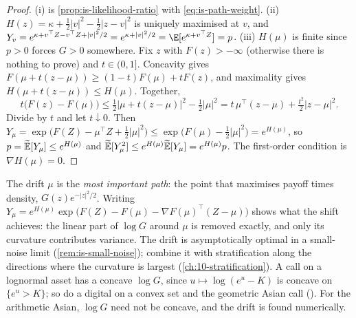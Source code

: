 \begin{proof}
(i) is \cref{prop:is-likelihood-ratio} with \eqref{eq:is-path-weight}.
(ii) $H(z)=\kappa+\frac12|v|^2-\frac12|z-v|^2$ is uniquely maximised at $v$, and
$Y_v=e^{\kappa+v^\top Z-v^\top Z+|v|^2/2}=e^{\kappa+|v|^2/2}=\E[e^{\kappa+v^\top Z}]=p$.
(iii) $H(\mu)$ is finite since $p>0$ forces $G>0$ somewhere. Fix $z$ with $F(z)>-\infty$
(otherwise there is nothing to prove) and $t\in(0,1]$. Concavity gives
$F(\mu+t(z-\mu))\ge(1-t)F(\mu)+tF(z)$, and maximality gives
$H(\mu+t(z-\mu))\le H(\mu)$. Together,
\[
  t\big(F(z)-F(\mu)\big)\le\tfrac12|\mu+t(z-\mu)|^2-\tfrac12|\mu|^2=t\,\mu^\top(z-\mu)+\tfrac{t^2}2|z-\mu|^2 .
\]
Divide by $t$ and let $t\downarrow0$. Then
$Y_\mu=\exp\big(F(Z)-\mu^\top Z+\frac12|\mu|^2\big)\le\exp\big(F(\mu)-\frac12|\mu|^2\big)=e^{H(\mu)}$,
so $p=\widetilde{\mathbb E}[Y_\mu]\le e^{H(\mu)}$ and $\widetilde{\mathbb E}[Y_\mu^2]\le e^{H(\mu)}\widetilde{\mathbb E}[Y_\mu]=e^{H(\mu)}p$.
The first-order condition is $\nabla H(\mu)=0$.
\end{proof}

The drift $\mu$ is the \emph{most important path}: the point that maximises payoff times
density, $G(z)e^{-|z|^2/2}$. Writing
$Y_\mu=e^{H(\mu)}\exp\big(F(Z)-F(\mu)-\nabla F(\mu)^\top(Z-\mu)\big)$ shows what the shift
achieves: the linear part of $\log G$ around $\mu$ is removed exactly, and only its curvature
contributes variance. The drift is asymptotically optimal in a small-noise limit
(\cref{rem:is-small-noise}); \textcite{glasserman-heidelberger-shahabuddin} combine it with
stratification along the directions where the curvature is largest (\cref{ch:10-stratification}). A call on a lognormal asset has a concave $\log G$,
since $u\mapsto\log(e^u-K)$ is concave on $\{e^u>K\}$; so do a digital on a convex set and the
geometric Asian call (). For the arithmetic Asian, $\log G$ need not be
concave, and the drift is found numerically.

